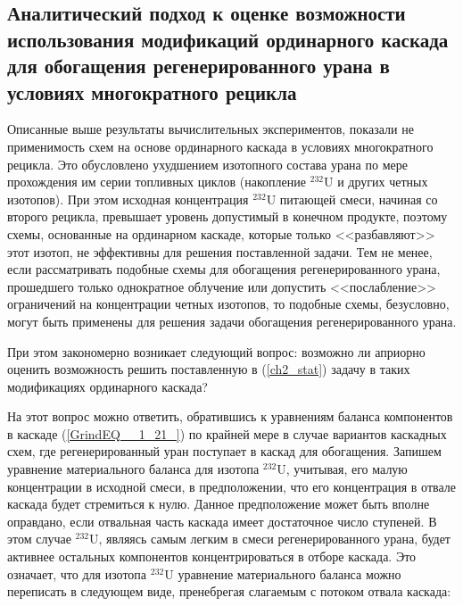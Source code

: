 
\subsection{Аналитический подход к оценке возможности использования модификаций ординарного каскада для обогащения регенерированного урана в условиях многократного рецикла}

Описанные выше результаты вычислительных экспериментов, показали не применимость схем на основе ординарного каскада в условиях  многократного рецикла. Это обусловлено ухудшением изотопного состава урана по мере прохождения им серии топливных циклов (накопление $^{232}$U и других четных изотопов). При этом исходная концентрация $^{232}$U питающей смеси, начиная со второго рецикла, превышает уровень допустимый в конечном продукте, поэтому схемы, основанные на ординарном каскаде, которые только <<разбавляют>> этот изотоп, не эффективны для решения поставленной задачи. Тем не менее, если рассматривать подобные схемы для обогащения регенерированного урана, прошедшего только однократное облучение или допустить <<послабление>> ограничений на концентрации четных изотопов, то подобные схемы, безусловно, могут быть применены для решения задачи обогащения регенерированного урана.

При этом закономерно возникает следующий вопрос: возможно ли априорно оценить возможность решить поставленную в (\ref{ch2_stat}) задачу в таких модификациях ординарного каскада? 

На этот вопрос можно ответить, обратившись к уравнениям баланса компонентов в каскаде (\ref{GrindEQ__1_21_}) по крайней мере в случае вариантов каскадных схем, где регенерированный уран поступает в каскад для обогащения. Запишем уравнение материального баланса для изотопа $^{232}$U, учитывая, его малую концентрации в исходной смеси, в предположении, что его концентрация в отвале каскада будет стремиться к нулю. Данное предположение может быть вполне оправдано, если отвальная часть каскада имеет достаточное число ступеней. В этом случае $^{232}$U, являясь самым легким в смеси регенерированного урана, будет активнее остальных компонентов концентрироваться в отборе каскада. Это означает, что для изотопа $^{232}$U уравнение материального баланса можно переписать в следующем виде, пренебрегая слагаемым с потоком отвала каскада:


